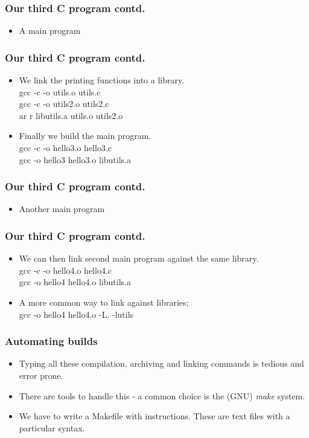 \documentclass{beamer}
\begin{document}
\begin{frame}\frametitle{Our third C program contd.}
  \begin{itemize}
    \item A main program
      
  \end{itemize}
\end{frame}

\begin{frame}\frametitle{Our third C program contd.}
  \begin{itemize}
    \item We link the printing functions into a library. \\
      gcc -c -o utils.o utils.c \\
      gcc -c -o utils2.o utils2.c \\
      ar r libutils.a utils.o utils2.o
    \item Finally we build the main program. \\
      gcc -c -o hello3.o hello3.c \\
      gcc -o hello3 hello3.o libutils.a 
  \end{itemize}
\end{frame}

\begin{frame}\frametitle{Our third C program contd.}
  \begin{itemize}
    \item Another main program
      
  \end{itemize}
\end{frame}

\begin{frame}\frametitle{Our third C program contd.}
  \begin{itemize}
    \item We can then link second main program against the same library. \\
      gcc -c -o hello4.o hello4.c \\
      gcc -o hello4 hello4.o libutils.a 
    \item A more common way to link against libraries; \\
      gcc -o hello4 hello4.o -L. -lutils
  \end{itemize}
\end{frame}

\begin{frame}\frametitle{Automating builds}
  \begin{itemize}
    \item Typing all these compilation, archiving and linking commands is tedious and error prone.
    \item There are tools to handle this - a common choice is the (GNU) \emph{make} system.
    \item We have to write a Makefile with instructions. These are text files with a particular syntax.
  \end{itemize}
\end{frame}
\end{document}
